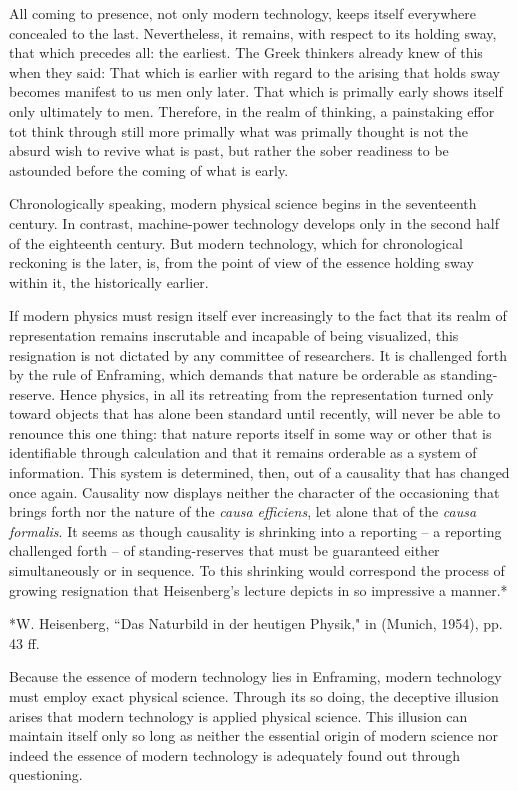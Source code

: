 All coming to presence, not only modern technology, keeps itself everywhere concealed to the last. Nevertheless, it remains, with respect to its holding sway, that which precedes all: the earliest. The Greek thinkers already knew of this when they said: That which is earlier with regard to the arising that holds sway becomes manifest to us men only later. That which is primally early shows itself only ultimately to men. Therefore, in the realm of thinking, a painstaking effor tot think through still more primally what was primally thought is not the absurd wish to revive what is past, but rather the sober readiness to be astounded before the coming of what is early.

Chronologically speaking, modern physical science begins in the seventeenth century. In contrast, machine-power technology develops only in the second half of the eighteenth century. But modern technology, which for chronological reckoning is the later, is, from the point of view of the essence holding sway within it, the historically earlier.

If modern physics must resign itself ever increasingly to the fact that its realm of representation remains inscrutable and incapable of being visualized, this resignation is not dictated by any committee of researchers. It is challenged forth by the rule of Enframing, which demands that nature be orderable as standing-reserve. Hence physics, in all its retreating from the representation turned only toward objects that has alone been standard until recently, will never be able to renounce this one thing: that nature reports itself in some way or other that is identifiable through calculation and that it remains orderable as a system of information. This system is determined, then, out of a causality that has changed once again. Causality now displays neither the character of the occasioning that brings forth nor the nature of the \textit{causa efficiens}, let alone that of the \textit{causa formalis}. It seems as though causality is shrinking into a reporting -- a reporting challenged forth -- of standing-reserves that must be guaranteed either simultaneously or in sequence. To this shrinking would correspond the process of growing resignation that Heisenberg's lecture depicts in so impressive a manner.*

*W. Heisenberg, ``Das Naturbild in der heutigen Physik," in  (Munich, 1954), pp. 43 ff.

Because the essence of modern technology lies in Enframing, modern technology must employ exact physical science. Through its so doing, the deceptive illusion arises that modern technology is applied physical science. This illusion can maintain itself only so long as neither the essential origin of modern science nor indeed the essence of modern technology is adequately found out through questioning.

